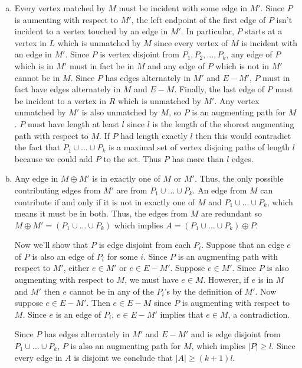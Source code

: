 \documentclass{article}
\begin{document}
\begin{enumerate}[a.]
\item Every vertex matched by $M$ must be incident with some edge in $M'$.  Since $P$ is aumenting with respect to $M'$, the left endpoint of the first edge of $P$ isn't incident to a vertex touched by an edge in $M'$. In particular, $P$ starts at a vertex in $L$ which is unmatched by $M$ since every vertex of $M$ is incident with an edge in $M'$.  Since $P$ is vertex disjoint from $P_1, P_2, \ldots, P_k$, any edge of $P$ which is in $M'$ must in fact be in $M$ and any edge of $P$ which is not in $M'$ cannot be in $M$.  Since $P$ has edges alternately in $M'$ and $E - M'$, $P$ must in fact have edges alternately in $M$ and $E-M$.  Finally, the last edge of $P$ must be incident to a vertex in $R$ which is unmatched by $M'$.  Any vertex unmatched by $M'$ is also unmatched by $M$, so $P$ is an augmenting path for $M$.  $P$ must have length at least $l$ since $l$ is the length of the shorest augmenting path with respect to $M$. If $P$ had length exactly $l$ then this would contradict the fact that $P_1 \cup \ldots \cup P_k$ is a maximal set of vertex disjoing paths of length $l$ because we could add $P$ to the set. Thus $P$ has more than $l$ edges. 

\item Any edge in $M \oplus M'$ is in exactly one of $M$ or $M'$.  Thus, the only possible contributing edges from $M'$ are from $P_1 \cup \ldots \cup P_k$.  An edge from $M$ can contribute if and only if it is not in exactly one of $M$ and $P_1 \cup \ldots \cup P_k$, which means it must be in both.  Thus, the edges from $M$ are redundant so $M\oplus M' = (P_1 \cup \ldots \cup P_k)$ which implies $A = (P_1 \cup \ldots \cup P_k) \oplus P$.  

Now we'll show that $P$ is edge disjoint from each $P_i$.  Suppose that an edge $e$ of $P$ is also an edge of $P_i$ for some $i$.  Since $P$ is an augmenting path with respect to $M'$, either $e \in M'$ or $e \in E-M'$.  Suppose $e \in M'$.  Since $P$ is also augmenting with respect to $M$, we must have $e \in M$.  However, if $e$ is in $M$ and $M'$ then $e$ cannot be in any of the $P_i$'s by the definition of $M'$.  Now suppose $e \in E-M'$. Then $e \in E-M$ since $P$ is augmenting with respect to $M$. Since $e$ is an edge of $P_i$, $e \in E-M'$ implies that $e \in M$, a contradiction.  

Since $P$ has edges alternately in $M'$ and $E-M'$ and is edge disjoint from $P_1 \cup \ldots \cup P_k$, $P$ is also an augmenting path for $M$, which implies $|P| \geq l$.  Since every edge in $A$ is disjoint we conclude that $|A| \geq (k+1)l$.


\end{enumerate}
\end{document}

